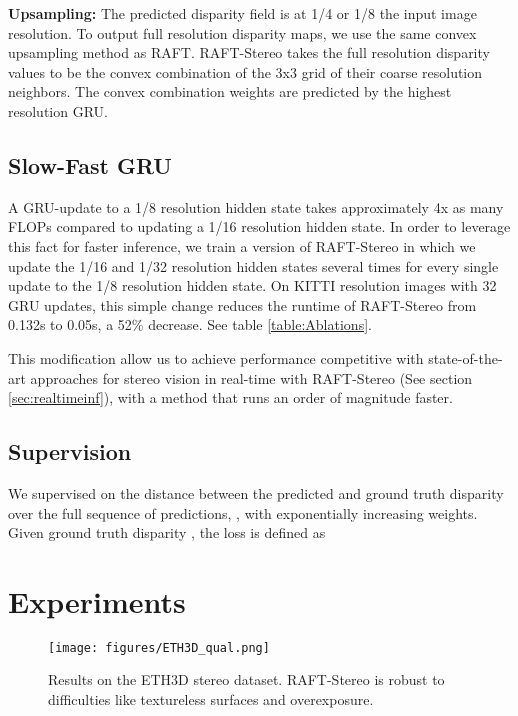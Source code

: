\documentclass[10pt,twocolumn,letterpaper]{article}
\begin{document}
\noindent\textbf{Upsampling:} The predicted disparity field is at 1/4 or 1/8 the input image resolution. To output full resolution disparity maps, we use the same convex upsampling method as RAFT. RAFT-Stereo takes the full resolution disparity values to be the convex combination of the 3x3 grid of their coarse resolution neighbors. The convex combination weights are predicted by the highest resolution GRU. \\

\vspace{-4mm}
\subsection{Slow-Fast GRU}
A GRU-update to a 1/8 resolution hidden state takes approximately 4x as many FLOPs compared to updating a 1/16 resolution hidden state. In order to leverage this fact for faster inference, we train a version of RAFT-Stereo in which we update the 1/16 and 1/32 resolution hidden states several times for every single update to the 1/8 resolution hidden state. On KITTI resolution images with 32 GRU updates, this simple change reduces the runtime of RAFT-Stereo from 0.132s to 0.05s, a 52\% decrease. See table \ref{table:Ablations}.

This modification allow us to achieve performance competitive with state-of-the-art approaches for stereo vision in real-time with RAFT-Stereo (See section \ref{sec:realtimeinf}), with a method that runs an order of magnitude faster.


\subsection{Supervision} 
We supervised on the  distance between the predicted and ground truth disparity over the full sequence of predictions, , with exponentially increasing weights. Given ground truth disparity , the loss is defined as




\section{Experiments}









\begin{figure*}[h]
\centering
	\texttt{[image: figures/ETH3D\_qual.png]}
	\caption{Results on the ETH3D stereo dataset. RAFT-Stereo is robust to difficulties like textureless surfaces and overexposure.}
	\label{fig:ETHQual}
\end{figure*}
\end{document}
